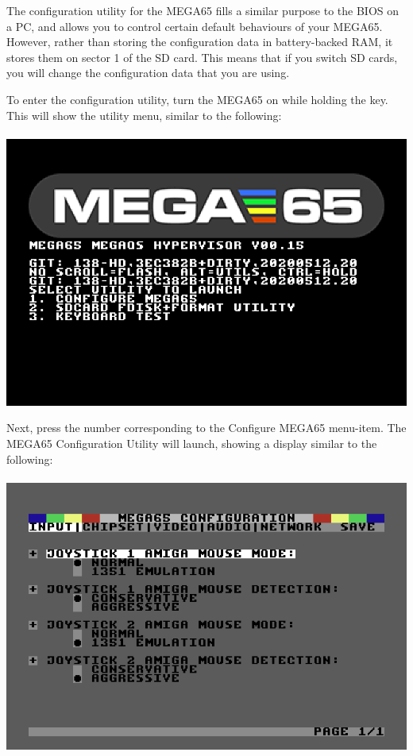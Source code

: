 The configuration utility for the MEGA65 fills a similar purpose to the BIOS on a
PC, and allows you to control certain default behaviours of your
MEGA65. However, rather than storing the configuration data in
battery-backed RAM, it stores them on sector 1 of the SD card. This means
that if you switch SD cards, you will change the configuration data that you are using.


\begin{minipage}{\linewidth}
  To enter the configuration utility, turn the MEGA65 on while
  holding the  key.  This will show the utility menu,
  similar to the following: \\
  \\
  \includegraphics[width=\linewidth]{images/ss-utilmenu.png}
\end{minipage}

\begin{minipage}{\linewidth}
  Next, press the number corresponding to the Configure MEGA65 menu-item.  The MEGA65
  Configuration Utility will launch, showing a display similar to
  the following: \\
  \\
  \includegraphics[width=\linewidth]{images/ss-m65config-1.png}
\end{minipage}

